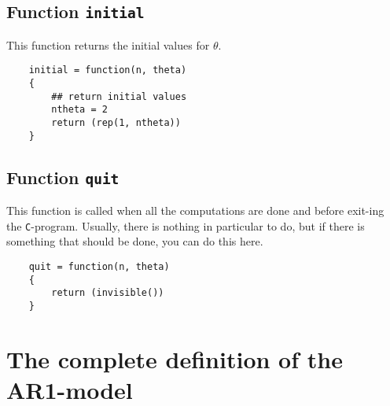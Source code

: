 \documentclass[a4paper,11pt]{article}
\begin{document}
\subsection*{Function \texttt{initial}}

This function returns the initial values for $\theta$.
{\small
\begin{verbatim}
    initial = function(n, theta)
    {
        ## return initial values
        ntheta = 2
        return (rep(1, ntheta))
    }
\end{verbatim}
}

\subsection*{Function \texttt{quit}}

This function is called when all the computations are done and before
exit-ing the \texttt{C}-program. Usually, there is nothing in
particular to do, but if there is something that should be done, you
can do this here.
{\small
\begin{verbatim}
    quit = function(n, theta)
    {
        return (invisible())
    }
\end{verbatim}
}


\section*{The complete definition of the AR1-model}
\end{document}
